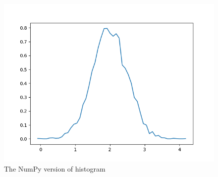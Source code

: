 \documentclass[UTF8]{article}
\begin{document}
\begin{figure}[ht]
    \centering
    \includegraphics[scale=0.6]{hist_numpy.png}
    \caption{The NumPy version of histogram}
\end{figure}
\end{document}
